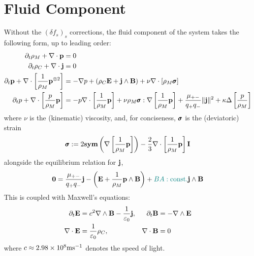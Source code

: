 \chapter{Fluid Component}

     Without the $(\delta f_{s})_{s}$ corrections, the fluid component of the system takes the following form, up to leading order: 
    \begin{align}
        \partial_{t}\rho_{M} + \nabla\cdot\mathbf{p}  &=  0  \\
        \partial_{t}\rho_{C} + \nabla\cdot\mathbf{j}  &=  0  \\
        \partial_{t}\mathbf{p} + \nabla\cdot\left[\frac{1}{\rho_{M}}\mathbf{p}^{\otimes 2}\right]  &=  - \nabla p + (\rho_{C}\mathbf{E} + \mathbf{j}\wedge\mathbf{B}) + \nu\nabla\cdot[\rho_{M}\pmb{\mathsf{\sigma}}]  \\
        \partial_{t}p + \nabla\cdot\left[\frac{p}{\rho_{M}}\mathbf{p}\right]  &=  - p\nabla\cdot\left[\frac{1}{\rho_{M}}\mathbf{p}\right] + \nu\rho_{M}\pmb{\mathsf{\sigma}}:\nabla\left[\frac{1}{\rho_{M}}\mathbf{p}\right] + \frac{\mu_{+-}}{q_{+}q_{-}}\|\mathbf{j}\|^{2} + \kappa\Delta\left[\frac{p}{\rho_{M}}\right]
    \end{align}
    where $\nu$ is the (kinematic) viscosity, and, for conciseness, $\pmb{\mathsf{\sigma}}$ is the (deviatoric) strain
    \begin{equation}\label{eqn:strain equation}
        \pmb{\mathsf{\sigma}}  :=  2\mathbf{sym}\left(\nabla\left[\frac{1}{\rho_{M}}\mathbf{p}\right]\right) - \frac{2}{3}\nabla\cdot\left[\frac{1}{\rho_{M}}\mathbf{p}\right]\mathbf{I}
    \end{equation}
    alongside the equilibrium relation for $\mathbf{j}$,
    \begin{equation}
        \mathbf{0}  =  \frac{\mu_{+-}}{q_{+}q_{-}}\mathbf{j} - \left(\mathbf{E} + \frac{1}{\rho_{M}}\mathbf{p}\wedge\mathbf{B}\right) + \textcolor{teal}{BA: \rm const.}\mathbf{j}\wedge\mathbf{B}
    \end{equation}
    This is coupled with Maxwell's equations:
    \begin{align*}
        \partial_{t}\mathbf{E}  &=  c^{2}\nabla\wedge\mathbf{B} - \frac{1}{\varepsilon_{0}}\mathbf{j},  &
        \partial_{t}\mathbf{B}  &=  - \nabla\wedge\mathbf{E}  \\
        \nabla\cdot\mathbf{E}  &=  \frac{1}{\varepsilon_{0}}\rho_{C},  &
        \nabla\cdot\mathbf{B}  &=  0
    \end{align*}
    where $c \approx 2.98\times 10^{8}\mathrm{m}\mathrm{s}^{- 1}$ denotes the speed of light.

